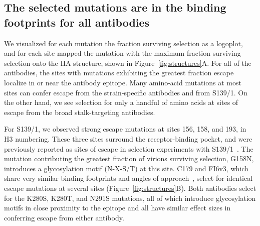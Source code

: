 \documentclass[11pt]{article}
\begin{document}
\subsection*{The selected mutations are in the binding footprints for all antibodies}
We visualized for each mutation the fraction surviving selection as a logoplot, and for each site mapped the mutation with the maximum fraction surviving selection onto the HA structure, shown in Figure~\ref{fig:structures}A. 
For all of the antibodies, the sites with mutations exhibiting the greatest fraction escape localize in or near the antibody epitope.
Many amino-acid mutations at most sites can confer escape from the strain-specific antibodies and from S139/1. 
On the other hand, we see selection for only a handful of amino acids at sites of escape from the broad stalk-targeting antibodies. 

For S139/1, we observed strong escape mutations at sites 156, 158, and 193, in H3 numbering. 
These three sites surround the receptor-binding pocket, and were previously reported as sites of escape in selection experiments with S139/1~\citep{yoshida2009cross}.
The mutation contributing the greatest fraction of virions surviving selection, G158N, introduces a glycosylation motif (N-X-S/T) at this site.
C179 and FI6v3, which share very similar binding footprints and angles of approach~\citep{dreyfus2013structure}, select for identical escape mutations at several sites (Figure~\ref{fig:structures}B). 
Both antibodies select for the K280S, K280T, and N291S mutations, all of which introduce glycosylation motifs in close proximity to the epitope and all have similar effect sizes in conferring escape from either antibody. 
\end{document}
